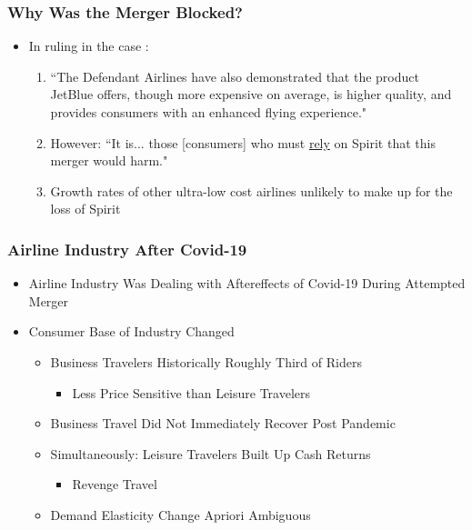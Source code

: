 \documentclass[xcolor=dvipsnames]{beamer}
\begin{document}
    \begin{frame}
        \frametitle{Why Was the Merger Blocked?}
        \begin{itemize}
            \item In ruling in the case \cite{william_g_young_findings_2024}:
            \begin{enumerate}
            \item ``The Defendant Airlines have also demonstrated that the product JetBlue offers, though more expensive on average, is higher quality, and provides consumers with an enhanced flying experience."
            \item   However: ``It is... those [consumers] who must \underline{rely} on Spirit that this merger would harm."
                \item Growth rates of other ultra-low cost airlines unlikely to make up for the loss of Spirit
            \end{enumerate}
        \end{itemize}
    \end{frame}

    \begin{frame}
        \frametitle{Airline Industry After Covid-19}
        \begin{itemize}
        \item Airline Industry Was Dealing with Aftereffects of Covid-19 During Attempted Merger
         \item Consumer Base of Industry Changed
            \begin{itemize}
                \item Business Travelers Historically Roughly Third of Riders
                \begin{itemize}
                    \item Less Price Sensitive than Leisure Travelers
                \end{itemize}
                \item Business Travel Did Not Immediately Recover Post Pandemic
                \item Simultaneously: Leisure Travelers Built Up Cash Returns
                \begin{itemize}
                    \item Revenge Travel
                \end{itemize}
                \item Demand Elasticity Change Apriori Ambiguous
            \end{itemize}
        \end{itemize}
    \end{frame}
\end{document}
